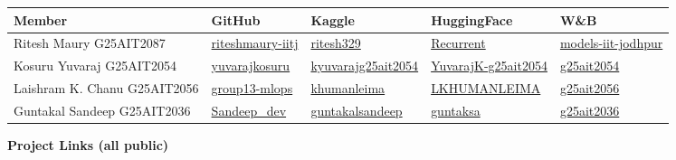 \documentclass[11pt,a4paper]{article}
\begin{document}
\vspace{0.2cm}
\renewcommand{\arraystretch}{1.4}
\begin{tabular}{p{3.2cm}p{2.8cm}p{3cm}p{3.5cm}p{2.5cm}}
\toprule
\textbf{Member} & \textbf{GitHub} & \textbf{Kaggle} & \textbf{HuggingFace} & \textbf{W\&B} \\
\midrule
Ritesh Maury \newline G25AIT2087 &
  \href{https://github.com/riteshmaury-iitj}{\small riteshmaury-iitj} &
  \href{https://www.kaggle.com/code/ritesh329/model-inferenence}{\small ritesh329} &
  \href{https://huggingface.co/Recurrent/ag-news-distilbert}{\small Recurrent} &
  \href{https://wandb.ai/models-iit-jodhpur/mlops-assignment-group13}{\small models-iit-jodhpur} \\
Kosuru Yuvaraj \newline G25AIT2054 &
  \href{https://github.com/yuvarajkosuru}{\small yuvarajkosuru} &
  \href{https://www.kaggle.com/kyuvarajg25ait2054}{\small kyuvarajg25ait2054} &
  \href{https://huggingface.co/YuvarajK-g25ait2054}{\small YuvarajK-g25ait2054} &
  \href{https://wandb.ai/g25ait2054-iit-jodhpur}{\small g25ait2054} \\
Laishram K. Chanu \newline G25AIT2056 &
  \href{https://github.com/riteshmaury-iitj/group13-assignment-mlops}{\small group13-mlops} &
  \href{https://www.kaggle.com/code/khumanleima/notebook35f6cea6a6}{\small khumanleima} &
  \href{https://huggingface.co/LKHUMANLEIMA/ag-news-distilbert}{\small LKHUMANLEIMA} &
  \href{https://wandb.ai/g25ait2056-indian-institute-of-technology-jodhpur/mlops-assignment3?nw=nwuserg25ait2056}{\small g25ait2056} \\
Guntakal Sandeep \newline G25AIT2036 &
  \href{https://github.com/riteshmaury-iitj/group13-assignment-mlops/tree/Sandeep\_dev}{\small Sandeep\_dev} &
  \href{https://www.kaggle.com/code/guntakalsandeepkumar/g25ait2036}{\small guntakalsandeep} &
  \href{https://huggingface.co/guntaksa/AG-News-distilbert1}{\small guntaksa} &
  \href{https://wandb.ai/g25ait2036-indian-institue-of-technology-jodhpur/mlops-assignment3}{\small g25ait2036} \\
\bottomrule
\end{tabular}

\vspace{0.5cm}

{\bfseries\color{darkgreen} Project Links (all public)}
\end{document}
